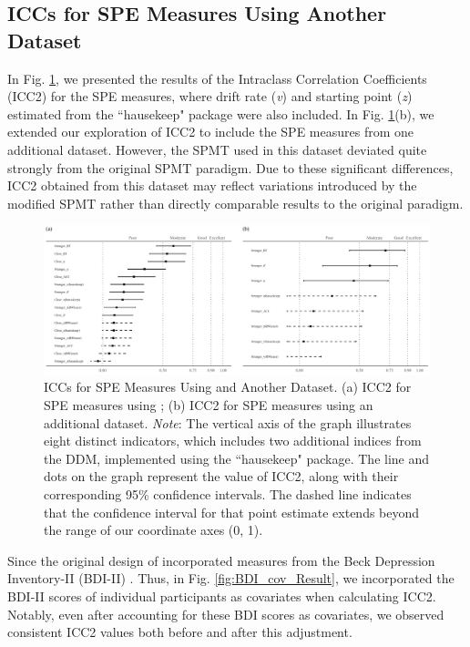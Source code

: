 \documentclass[sn-apa]{sn-jnl}%
\theoremstyle{thmstyleone}%
\theoremstyle{thmstyletwo}%
\theoremstyle{thmstylethree}%
\begin{document}
\subsection{ICCs for SPE Measures Using Another Dataset}\label{sec:ICC}

In Fig. \ref{fig:ICC_Result}, we presented the results of the Intraclass Correlation Coefficients (ICC2) for the SPE measures, where drift rate (\textit{v}) and starting point (\textit{z}) estimated from the ``hausekeep" package were also included. In Fig. \ref{fig:ICC_Result}(b), we extended our exploration of ICC2 to include the SPE measures from one additional dataset. However, the SPMT used in this dataset deviated quite strongly from the original SPMT paradigm. Due to these significant differences, ICC2 obtained from this dataset may reflect variations introduced by the modified SPMT rather than directly comparable results to the original paradigm.

\begin{figure}[!ht]
	\centering
	\includegraphics[width=1\textwidth]{./Figure/Fig4_ICC.png}
	\caption[ICCs for SPE Measures Using \textcite{hu2023data} and Another Dataset]{ICCs for SPE Measures Using \textcite{hu2023data} and Another Dataset. (a) ICC2 for SPE measures using \textcite{hu2023data}; (b) ICC2 for SPE measures using an additional dataset.  \textit{Note}: The vertical axis of the graph illustrates eight distinct indicators, which includes two additional indices from the DDM, implemented using the ``hausekeep" package. The line and dots on the graph represent the value of ICC2, along with their corresponding 95\% confidence intervals. The dashed line indicates that the confidence interval for that point estimate extends beyond the range of our coordinate axes (0, 1).
	}\label{fig:ICC_Result}
\end{figure}

Since the original design of \textcite{hu2023data} incorporated measures from the Beck Depression Inventory-II (BDI-II) \parencite{wang2011reliability}. Thus, in Fig. \ref{fig:BDI_cov_Result}, we incorporated the BDI-II scores of individual participants as covariates when calculating ICC2. Notably, even after accounting for these BDI scores as covariates, we observed consistent ICC2 values both before and after this adjustment.
\clearpage
\end{document}
